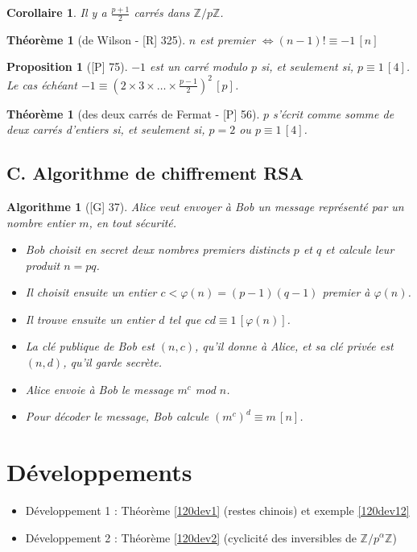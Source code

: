 \documentclass[10pt, a4paper, parskip=full, twoside, twocolumn]{report}
\newtheorem{theorem}[definition]{Théorème}
\newtheorem{proposition}[definition]{Proposition}
\newtheorem{corollary}[definition]{Corollaire}
\newtheorem{algorithm}[definition]{Algorithme}
\newcommand{\IZ}{\mathbb{Z}}
\begin{document}
\begin{corollary}
	Il y a $\frac{p+1}{2}$ carrés dans $\IZ/p\IZ$.
\end{corollary}

\begin{theorem}[de Wilson - \textnormal{[R] 325}]
	$n$ est premier $\iff (n-1)! \equiv -1\, [n]$
\end{theorem}

\begin{proposition}[\textnormal{[P] 75}]
	$-1$ est un carré modulo $p$ si, et seulement si, $p\equiv 1\,[4]$. Le cas échéant $-1\equiv (2\times 3\times\dots\times \frac{p-1}{2})^2\,[p]$.
\end{proposition}

\begin{theorem}[des deux carrés de Fermat - \textnormal{[P] 56}]
	$p$ s'écrit comme somme de deux carrés d'entiers si, et seulement si, $p=2$ ou $p \equiv 1\,[4]$.
\end{theorem}

\subsection*{C. Algorithme de chiffrement RSA}

\begin{algorithm}[\textnormal{[G] 37}]
	Alice veut envoyer à Bob un message représenté par un nombre 
entier $m$, en tout sécurité.
\begin{itemize}
	\item Bob choisit en secret deux nombres premiers distincts $p$ et $q$ et calcule leur produit $n=pq$.
	\item Il choisit ensuite un entier $c<\varphi(n)=(p-1)(q-1)$ premier à $\varphi(n)$.
	\item Il trouve ensuite un entier $d$ tel que $cd \equiv 1\,[\varphi(n)]$.
	\item La clé publique de Bob est $(n,c)$, qu'il donne à Alice, et sa clé privée est $(n,d)$, qu'il garde secrète.
	\item Alice envoie à Bob le message $m^c$ mod $n$.
	\item Pour décoder le message, Bob calcule $\left(m^c\right)^d\equiv m\,[n]$.
\end{itemize}
\end{algorithm}

\section*{Développements}
\begin{itemize}
	\item Développement 1 : Théorème \ref{120dev1} (restes chinois) et exemple \ref{120dev12}
	\item Développement 2 : Théorème \ref{120dev2} (cyclicité des inversibles de $\IZ/p^{\alpha}\IZ$)
\end{itemize}
\end{document}
